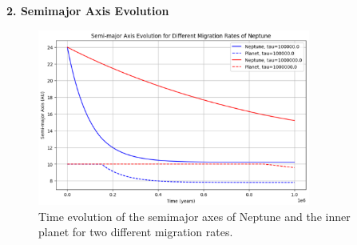 \documentclass[12pt,a4paper]{article}
\begin{document}
\textbf{2. Semimajor Axis Evolution}
\begin{figure}[h]
  \centering
  \includegraphics[width=0.8\textwidth]{ExpoMig/SemimajorAxis_Evo.png}
  \caption{Time evolution of the semimajor axes of Neptune and the inner planet for two different migration rates.}
  \label{fig:semimajor}
\end{figure}
\end{document}
